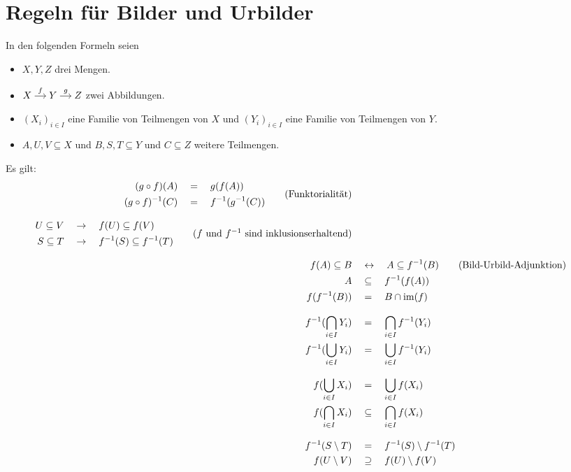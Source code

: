 \section{Regeln für Bilder und Urbilder}
In den folgenden Formeln seien
\begin{itemize}
    \item $X,Y,Z$ drei Mengen.
    \item $\begin{tikzcd}[cramped, column sep=small] X \ar[r, "f"] &  Y\ar[r, "g"] & Z \end{tikzcd}$ zwei Abbildungen.
    \item $(X_i)_{i\in I}$ eine Familie von Teilmengen von $X$ und $(Y_i)_{i\in I}$ eine Familie von Teilmengen von $Y$.
    \item $A,U,V\subseteq X$ und $B,S,T\subseteq Y$ und $C\subseteq Z$ weitere Teilmengen.
\end{itemize}
Es gilt:
\begingroup
\allowdisplaybreaks
\begin{align*}
    \begin{split}
    (g\circ f)(A) & \quad=\quad g(f(A)) \\
    (g\circ f)^{-1}(C) & \quad=\quad f^{-1}(g^{-1}(C))
    \end{split} \tag{Funktorialität} \\[0.8em]
    \begin{split}
        U\subseteq V & \quad \to\quad f(U) \subseteq f(V) \\
        S\subseteq T & \quad \to\quad f^{-1}(S)\subseteq f^{-1}(T)
    \end{split} \tag{$f$ und $f^{-1}$ sind inklusionserhaltend} \\[0.8em]
    f(A) \subseteq B & \quad \leftrightarrow\quad A \subseteq f^{-1}(B) \tag{Bild-Urbild-Adjunktion} \\
    A & \quad \subseteq\quad f^{-1}(f(A)) \\
    f(f^{-1}(B)) & \quad=\quad B\cap \im(f) \\[0.8em]
    f^{-1}(\bigcap_{i \in I} Y_i) & \quad=\quad \bigcap_{i \in I} f^{-1}(Y_i) \\
    f^{-1} (\bigcup_{i \in I} Y_i) & \quad=\quad \bigcup_{i \in I} f^{-1}(Y_i) \\[0.8em]
    f(\bigcup_{i \in I} X_i) & \quad=\quad \bigcup_{i \in I} f(X_i) \\
    f(\bigcap_{i \in I} X_i) & \quad \subseteq\quad \bigcap_{i \in I} f(X_i) \\[0.8em]
    f^{-1}(S\setminus T) & \quad=\quad f^{-1}(S)\setminus f^{-1}(T) \\
    f(U\setminus V) & \quad \supseteq\quad f(U)\setminus f(V)
\end{align*}
\endgroup





